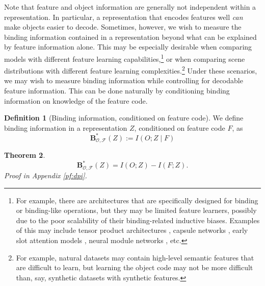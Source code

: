 \documentclass{article}
\theoremstyle{plain}
\newtheorem{theorem}{Theorem}[section]
\theoremstyle{definition}
\newtheorem{definition}[theorem]{Definition}
\theoremstyle{remark}
\begin{document}
Note that feature and object information are generally not independent within a representation. In particular, a representation that encodes features well \textit{can} make objects easier to decode. Sometimes, however, we wish to measure the binding information contained in a representation beyond what can be explained by feature information alone. This may be especially desirable when comparing models with different feature learning capabilities,\footnote{For example, there are architectures that are specifically designed for binding or binding-like operations, but they may be limited feature learners, possibly due to the poor scalability of their binding-related inductive biases. Examples of this may include tensor product architectures \cite{10.1016/0004-3702(90)90007-M}, capsule networks \cite{sabour2017dynamicroutingcapsules}, early slot attention models \cite{locatello2020object, seitzer2023bridginggaprealworldobjectcentric}, neural module networks \cite{andreas2017neuralmodulenetworks}, etc.} or when comparing scene distributions with different feature learning complexities.\footnote{For example, natural datasets may contain high-level semantic features that are difficult to learn, but learning the object code may not be more difficult than, say, synthetic datasets with synthetic features.} Under these scenarios, we may wish to measure binding information while controlling for decodable feature information. This can be done naturally by conditioning binding information on knowledge of the feature code. 



\begin{definition}[Binding information, conditioned on feature code]

We define binding information in a representation $Z$, conditioned on feature code $F$, as
\[
\mathbf{B}_{\mathcal{O, F}}^{*}(Z):=I(O;Z\mid F)
\]
\label{binding_cond}
\end{definition}
\begin{theorem}
    \[
    \mathbf{B}_{\mathcal{O, F}}^{*}(Z)=I(O;Z)-I(F;Z).
    \]
    Proof in Appendix \ref{pf:dpi}.
\label{minusbinding}
\end{theorem}
\end{document}

